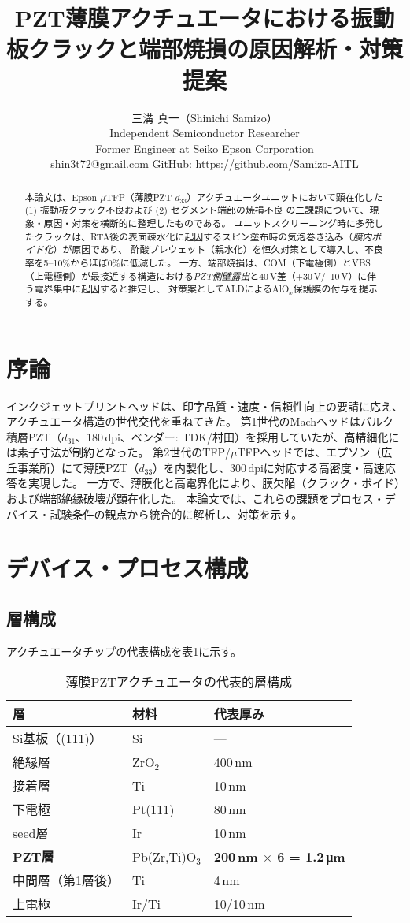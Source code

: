 \documentclass[11pt,a4paper]{ltjsarticle} %
\title{PZT薄膜アクチュエータにおける振動板クラックと端部焼損の原因解析・対策提案}
\author{三溝 真一（Shinichi Samizo）\\
Independent Semiconductor Researcher\\
Former Engineer at Seiko Epson Corporation\\
\href{mailto:shin3t72@gmail.com}{shin3t72@gmail.com}\quad
GitHub: \url{https://github.com/Samizo-AITL}}
\date{} %
\begin{document}
\maketitle

\begin{abstract}
本論文は、Epson $\mu$TFP（薄膜PZT $d_{33}$）アクチュエータユニットにおいて顕在化した
(1) 振動板クラック不良および (2) セグメント端部の焼損不良
の二課題について、現象・原因・対策を横断的に整理したものである。
ユニットスクリーニング時に多発したクラックは、RTA後の表面疎水化に起因するスピン塗布時の気泡巻き込み（\emph{膜内ボイド化}）が原因であり、
酢酸プレウェット（親水化）を恒久対策として導入し、不良率を5--10\%からほぼ0\%に低減した。
一方、端部焼損は、COM（下電極側）とVBS（上電極側）が最接近する構造における\emph{PZT側壁露出}と40\,V差（+30\,V/--10\,V）に伴う電界集中に起因すると推定し、
対策案としてALDによるAlO$_x$保護膜の付与を提示する。
\end{abstract}

\section{序論}
インクジェットプリントヘッドは、印字品質・速度・信頼性向上の要請に応え、アクチュエータ構造の世代交代を重ねてきた。
第1世代のMachヘッドはバルク積層PZT（$d_{31}$、180\,dpi、ベンダー: TDK/村田）を採用していたが、高精細化には素子寸法が制約となった。
第2世代のTFP/$\mu$TFPヘッドでは、エプソン（広丘事業所）にて薄膜PZT（$d_{33}$）を内製化し、300\,dpiに対応する高密度・高速応答を実現した。
一方で、薄膜化と高電界化により、膜欠陥（クラック・ボイド）および端部絶縁破壊が顕在化した。
本論文では、これらの課題をプロセス・デバイス・試験条件の観点から統合的に解析し、対策を示す。

\section{デバイス・プロセス構成}
\subsection{層構成}
アクチュエータチップの代表構成を表\ref{tab:stack}に示す。
\begin{table}[h]
  \centering
  \caption{薄膜PZTアクチュエータの代表的層構成}
  \label{tab:stack}
  \begin{tabular}{@{}lll@{}}
    \toprule
    層 & 材料 & 代表厚み \\\midrule
    Si基板（(111)） & Si & --- \\
    絶縁層 & ZrO$_2$ & 400\,nm \\
    接着層 & Ti & 10\,nm \\
    下電極 & Pt(111) & 80\,nm \\
    seed層 & Ir & 10\,nm \\
    \textbf{PZT層} & Pb(Zr,Ti)O$_3$ & \textbf{200\,nm $\times$ 6 = 1.2\,\si{\micro\meter}} \\
    中間層（第1層後） & Ti & 4\,nm \\
    上電極 & Ir/Ti & 10/10\,nm \\\bottomrule
  \end{tabular}
\end{table}
\end{document}
